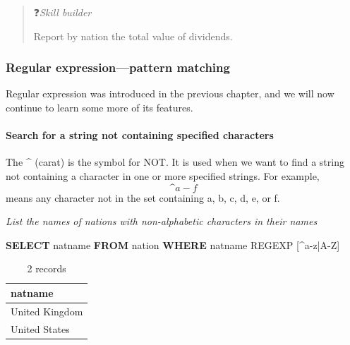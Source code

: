 \documentclass[
]{article}
\newenvironment{Shaded}{\begin{snugshade}}{\end{snugshade}}
\newcommand{\KeywordTok}[1]{\textcolor[rgb]{0.13,0.29,0.53}{\textbf{#1}}}
\newcommand{\NormalTok}[1]{#1}
\newcommand{\StringTok}[1]{\textcolor[rgb]{0.31,0.60,0.02}{#1}}
\begin{document}
\begin{quote}
❓\emph{Skill builder}

Report by nation the total value of dividends.
\end{quote}

\hypertarget{regular-expressionpattern-matching-1}{%
\subsubsection*{Regular expression---pattern matching}\label{regular-expressionpattern-matching-1}}

Regular expression was introduced in the previous chapter, and we will
now continue to learn some more of its features.

\hypertarget{search-for-a-string-not-containing-specified-characters}{%
\paragraph*{Search for a string not containing specified characters}\label{search-for-a-string-not-containing-specified-characters}}

The \^{} (carat) is the symbol for NOT. It is used when we want to find a
string not containing a character in one or more specified strings. For
example, \[\^a-f\] means any character not in the set containing a, b,
c, d, e, or f.

\emph{List the names of nations with non-alphabetic characters in their
names}

\begin{Shaded}
\begin{Highlighting}[]
\KeywordTok{SELECT}\NormalTok{ natname }\KeywordTok{FROM}\NormalTok{ nation }\KeywordTok{WHERE}\NormalTok{ natname REGEXP }\StringTok{\textquotesingle{}[\^{}a{-}z|A{-}Z]\textquotesingle{}}
\end{Highlighting}
\end{Shaded}

\begin{table}

\caption{\label{tab:unnamed-chunk-47}2 records}
\centering
\begin{tabular}[t]{l}
\hline
natname\\
\hline
United Kingdom\\
\hline
United States\\
\hline
\end{tabular}
\end{table}
\end{document}
